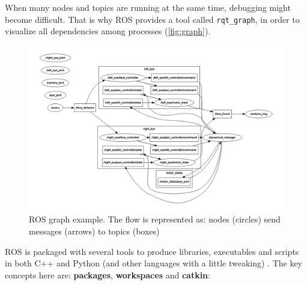 When many nodes and topics are running at the same time, debugging might become difficult. That is why ROS provides a tool called \texttt{rqt\_graph}, in order to visualize all dependencies among processes (\autoref{fig:graph}).
\begin{figure}[htb]
  \centering
  \includegraphics[width=\linewidth]{pictures/02/graph}
  \caption[ROS graph example]{ROS graph example. The flow is represented as: nodes (circles) send messages (arrows) to topics (boxes)}
  \label{fig:graph}
\end{figure}

 ROS is packaged with several tools to produce libraries, executables and scripts in both C++ and Python (and other languages with a little tweaking) . The key concepts here are: \textbf{packages}, \textbf{workspaces} and \textbf{catkin}:

